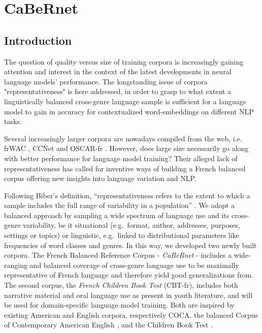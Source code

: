 \chapter{CaBeRnet}

\section{Introduction}\label{sect:Intro}

The question of quality versus size of training corpora is increasingly gaining attention and interest in the context of the latest developments in neural language models' performance.
The longstanding issue of corpora "representativeness" is here addressed, in order to grasp to what extent a linguistically balanced cross-genre language sample is sufficient for a language model to gain in accuracy for contextualized word-embeddings on different NLP tasks.

Several increasingly larger corpora are nowadays compiled from the web, i.e. frWAC \citep{baroni-etal-2009-the}, CCNet \citep{wenzek-etal-2020-ccnet} and OSCAR-fr \citep{ortiz-suarez-etal-2019-asynchronous}. However, does large size necessarily go along with better performance for language model training? Their alleged lack of representativeness has called for inventive ways of building a French balanced corpus offering new insights into language variation and NLP.

Following Biber's definition, “representativeness refers to the extent to which a sample includes the full range of variability in a population” \citep{biber-1993-representativeness}. We adopt a balanced approach by sampling a wide spectrum of language use and its cross-genre variability, be it situational (e.g.\ format, author, addressee, purposes, settings or topics) or linguistic, e.g.\ linked to distributional parameters like frequencies of word classes and genres.
In this way, we developed two newly built corpora. The French Balanced Reference Corpus - \textit{CaBeRnet} - includes a wide-ranging and balanced coverage of cross-genre language use to be maximally representative of French language and therefore yield good generalizations from. The second corpus, the \textit{French Children Book Test} (CBT-fr), includes both narrative material and oral language use as present in youth literature, and will be used for domain-specific language model training. Both are inspired by existing American and English corpora, respectively  COCA, the balanced Corpus of Contemporary American English \citep{davies-2009-the, davies-2010-the}, and the Children Book Test \citep[CBT]{hill-etal-2016-the}.

